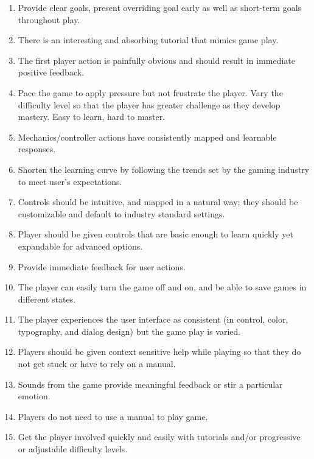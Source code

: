 \begin{enumerate}
	\item Provide clear goals, present overriding goal early as well as short-term goals throughout play.
	\item There is an interesting and absorbing tutorial that mimics game play.
	\item The first player action is painfully obvious and should result in immediate positive feedback.
	\item Pace the game to apply pressure but not frustrate the player. Vary the difficulty level so that the player has greater challenge as they develop mastery. Easy to learn, hard to master.
	\item Mechanics/controller actions have consistently mapped and learnable responses.
	\item Shorten the learning curve by following the trends set by the gaming industry to meet user’s expectations.
	\item Controls should be intuitive, and mapped in a natural way; they should be customizable and default to industry standard settings.
	\item Player should be given controls that are basic enough to learn quickly yet expandable for advanced options.
	\item Provide immediate feedback for user actions.
	\item The player can easily turn the game off and on, and be able to save games in different states.
	\item The player experiences the user interface as consistent (in control, color, typography, and dialog design) but the game play is varied.
	\item Players should be given context sensitive help while playing so that they do not get stuck or have to rely on a manual.
	\item Sounds from the game provide meaningful feedback or stir a particular emotion.
	\item Players do not need to use a manual to play game.
	\item Get the player involved quickly and easily with tutorials and/or progressive or adjustable difficulty levels.
\end{enumerate}

